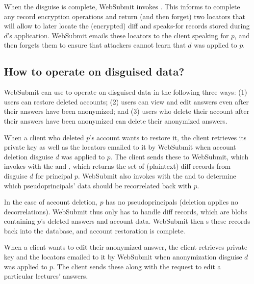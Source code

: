 When the disguise is complete, WebSubmit invokes . This informs \sys to complete any
record encryption operations and return (and then forget) two locators  that will allow \sys
to later locate the (encrypted) diff and speaks-for records stored during $d$'s application.
%
WebSubmit emails these locators to the client speaking for $p$, and then forgets them to ensure that
attackers cannot learn that $d$ was applied to $p$.

\subsection{How to operate on disguised data?}
\label{s:op-disg}

WebSubmit can use \sys to operate on disguised data in the following three ways: (1) users can
restore deleted accounts; (2) users can view and edit answers even after their answers have been
anonymized; and (3) users who delete their account after their answers have been anonymized can
delete their anonymized answers.

When a client who deleted $p$'s account wants to restore it, the client retrieves its private key
 as well as the locators  emailed to it by WebSubmit when account deletion disguise $d$ was applied to $p$.
The client sends these to WebSubmit, which invokes  with the  and , which returns the set of (plaintext) diff records from disguise $d$ for principal $p$.
WebSubmit also invokes  with the  and  to determine which
pseudoprincipals' data should be recorrelated back with $p$.

In the case of account deletion, $p$ has no pseudoprincipals (deletion applies no decorrelations).
WebSubmit thus only has to handle diff records, which are blobs containing $p$'s deleted answers and
account data.  WebSubmit then s these records back into the database, and account
restoration is complete.

When a client wants to edit their anonymized answer, the client retrieves private key
 and the locators  emailed to it by WebSubmit when anonymization disguise $d$ was
applied to $p$. The client sends these along with the request to edit a particular lectures'
answers.

